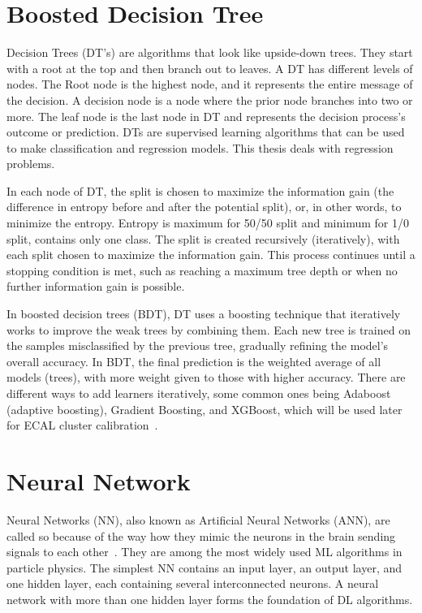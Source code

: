 \section{Boosted Decision Tree}
Decision Trees (DT's) are algorithms that look like upside-down trees.
They start with a root at the top and then branch out to leaves.
A DT has different levels of nodes. The Root node is the highest node, and it represents the entire message of the decision.
A decision node is a node where the prior node branches into two or more.
The leaf node is the last node in DT and represents the decision process's outcome or prediction.
DTs are supervised learning algorithms that can be used to make classification and regression models. This thesis deals with regression problems.

In each node of DT, the split is chosen to maximize the information gain (the difference in entropy before and after the potential split), or, in other words, to minimize the entropy.
Entropy is maximum for 50/50 split and minimum for 1/0 split, \ie contains only one class.
The split is created recursively (iteratively), with each split chosen to maximize the information gain.
This process continues until a stopping condition is met, such as reaching a maximum tree depth or when no further information gain is possible.

In boosted decision trees (BDT), DT uses a boosting technique that iteratively works to improve the weak trees by combining them.
Each new tree is trained on the samples misclassified by the previous tree, gradually refining the model's overall accuracy.
In BDT, the final prediction is the weighted average of all models (trees), with more weight given to those with higher accuracy.
There are different ways to add learners iteratively, some common ones being Adaboost (adaptive boosting), Gradient Boosting, and XGBoost,
which will be used later for ECAL cluster calibration~\cite{BDT}.

\section{Neural Network}
Neural Networks (NN), also known as Artificial Neural Networks (ANN), are called so because of the way how they mimic the neurons in the brain sending signals to each other~\cite{NN}.
They are among the most widely used ML algorithms in particle physics.
The simplest NN contains an input layer, an output layer, and one hidden layer, each containing several interconnected neurons.
A neural network with more than one hidden layer forms the foundation of DL algorithms.

